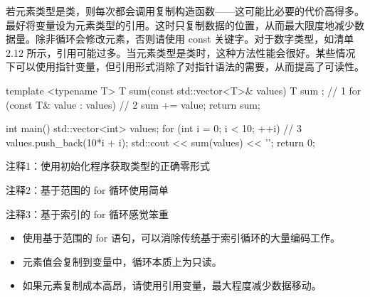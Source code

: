 若元素类型是类，则每次都会调用复制构造函数——这可能比必要的代价高得多。最好将变量设为元素类型的引用。这时只复制数据的位置，从而最大限度地减少数据量。除非循环会修改元素，否则请使用 const 关键字。对于数字类型，如清单 2.12 所示，引用可能过多。当元素类型是类时，这种方法性能会很好。某些情况下可以使用指针变量，但引用形式消除了对指针语法的需要，从而提高了可读性。


\begin{cpp}
template <typename T>
T sum(const std::vector<T>& values) {
  T sum {}; // 1
  for (const T& value : values) // 2
    sum += value;
  return sum;
}

int main() {
  std::vector<int> values;
  for (int i = 0; i < 10; ++i) // 3
    values.push_back(10*i + i);
  std::cout << sum(values) << '\n';
  return 0;
}
\end{cpp}

{\footnotesize
注释1：使用初始化程序获取类型的正确零形式

注释2：基于范围的 for 循环使用简单

注释3：基于索引的 for 循环感觉笨重
}


\begin{itemize}
\item
使用基于范围的 for 语句，可以消除传统基于索引循环的大量编码工作。

\item
元素值会复制到变量中，循环本质上为只读。

\item
如果元素复制成本高昂，请使用引用变量，最大程度减少数据移动。
\end{itemize}



















